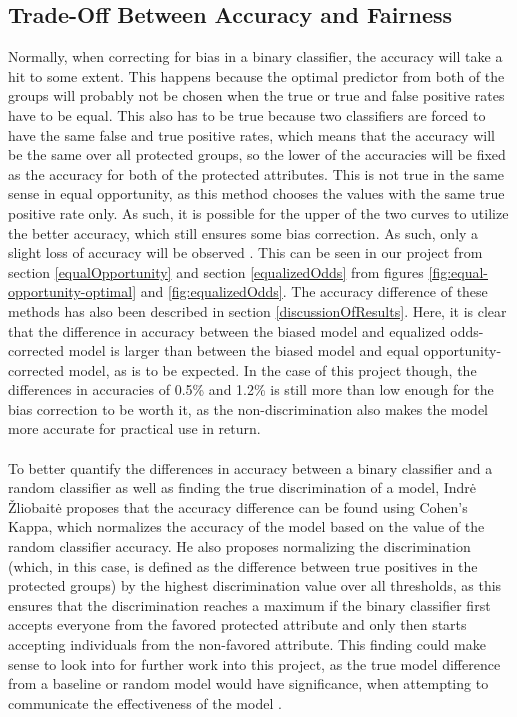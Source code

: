 \documentclass[11pt, fleqn, titlepage]{article}
\begin{document}
	\subsection{Trade-Off Between Accuracy and Fairness}\label{tradeoff}
	Normally, when correcting for bias in a binary classifier, the accuracy will take a hit to some extent. This happens because the optimal predictor from both of the groups will probably not be chosen when the true or true and false positive rates have to be equal. This also has to be true because two classifiers are forced to have the same false and true positive rates, which means that the accuracy will be the same over all protected groups, so the lower of the accuracies will be fixed as the accuracy for both of the protected attributes. This is not true in the same sense in equal opportunity, as this method chooses the values with the same true positive rate only. As such, it is possible for the upper of the two curves to utilize the better accuracy, which still ensures some bias correction. As such, only a slight loss of accuracy will be observed \cite{equal_of_oppor}. This can be seen in our project from section \ref{equalOpportunity} and section \ref{equalizedOdds} from figures \ref{fig:equal-opportunity-optimal} and \ref{fig:equalizedOdds}. The accuracy difference of these methods has also been described in section \ref{discussionOfResults}. Here, it is clear that the difference in accuracy between the biased model and equalized odds-corrected model is larger than between the biased model and equal opportunity-corrected model, as is to be expected. In the case of this project though, the differences in accuracies of 0.5\% and 1.2\% is still more than low enough for the bias correction to be worth it, as the non-discrimination also makes the model more accurate for practical use in return.\\\\
	\noindent	
	To better quantify the differences in accuracy between a binary classifier and a random classifier as well as finding the true discrimination of a model, Indrė Žliobaitė proposes that the accuracy difference can be found using Cohen's Kappa, which normalizes the accuracy of the model based on the value of the random classifier accuracy. He also proposes normalizing the discrimination (which, in this case, is defined as the difference between true positives in the protected groups) by the highest discrimination value over all thresholds, as this ensures that the discrimination reaches a maximum if the binary classifier first accepts everyone from the favored protected attribute and only then starts accepting individuals from the non-favored attribute. This finding could make sense to look into for further work into this project, as the true model difference from a baseline or random model would have significance, when attempting to communicate the effectiveness of the model \cite{bias-accuracy}.
	
\end{document}
